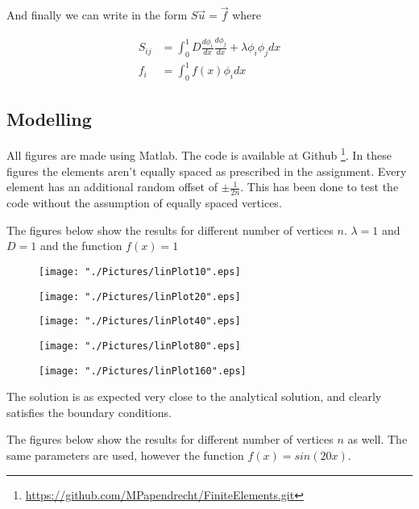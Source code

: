 \documentclass[10pt,a4paper]{article}
\begin{document}
And finally we can write in the form $S \vec{u} = \vec{f}$ where 

\begin{align}
S_{ij} &= \int_0^1 D \frac{d \phi_i}{dx} \frac{d \phi_j}{dx} + \lambda \phi_i \phi_j dx \\
f_i &= \int_0^1 f(x) \phi_i dx
\end{align}

\subsection{Modelling}
All figures are made using Matlab. 
The code is available at Github \footnote{ \url{https://github.com/MPapendrecht/FiniteElements.git}}. 
In these figures the elements aren't equally spaced as prescribed in the assignment. 
Every element has an additional random offset of $\pm \frac{1}{2n}$. 
This has been done to test the code without the assumption of equally spaced vertices.

\def\scale{0.20}

The figures below show the results for different number of vertices $n$. $\lambda = 1$ and $D = 1$ and the function $f(x)=1$
\begin{figure}[H]
	\centering
	\texttt{[image: "./Pictures/linPlot10".eps]}
\end{figure}
\begin{figure}[H]
	\centering
	\texttt{[image: "./Pictures/linPlot20".eps]}
\end{figure}
\begin{figure}[H]
	\centering
	\texttt{[image: "./Pictures/linPlot40".eps]}
\end{figure}
\begin{figure}[H]
	\centering
	\texttt{[image: "./Pictures/linPlot80".eps]}
\end{figure}
\begin{figure}[H]
	\centering
	\texttt{[image: "./Pictures/linPlot160".eps]}
\end{figure}

The solution is as expected very close to the analytical solution, and clearly satisfies the boundary conditions. 

The figures below show the results for different number of vertices $n$ as well. The same parameters are used, however the function $f(x)=sin(20x)$.
\end{document}
